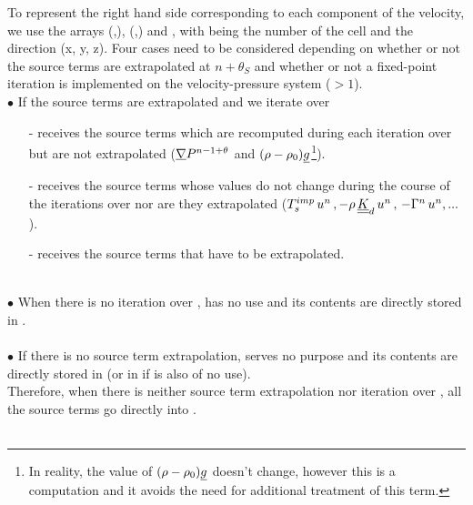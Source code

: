 To represent the right hand side corresponding to each component of the velocity, we use the arrays (,), (,) and , with  being the number of the cell and  the direction (x, y, z). Four cases need to be considered depending on whether or not the source terms are extrapolated at $n+\theta_S$ and whether or not a fixed-point iteration is implemented on the velocity-pressure system ($>1$).
\\
$\bullet$ If the source terms are extrapolated and we iterate over \\
\begin{itemize}
\item [-] receives the source terms which are recomputed during each iteration over  but are not extrapolated
($\underline{\nabla}{P^{n-1+\theta}}$ and $(\rho -\rho_0) \underline{g}$\footnote{In reality, the value of
$(\rho -\rho_0) \underline{g}$ doesn't change, however this is a computation and it avoids the need for additional treatment of this term.}).\\
\item [-] receives the source terms whose values do not change during the course of the iterations over  nor are they extrapolated
($T_s^{imp}\,u^n\,,-\rho\,\underline{\underline{K}}_{d}\,u^n\,,\,-\Gamma^n\,u^n,...$).\\
\item [-] receives the source terms that have to be extrapolated.\\
\\
\end{itemize}
$\bullet$ When there is no iteration over ,  has no use and its contents are directly stored in .\\
\\
$\bullet$ If there is no source term extrapolation,  serves no purpose and its contents are directly stored in  (or in  if  is also of no use).\\
Therefore, when there is neither source term extrapolation nor iteration over , all the source terms go directly into .\\
\\
